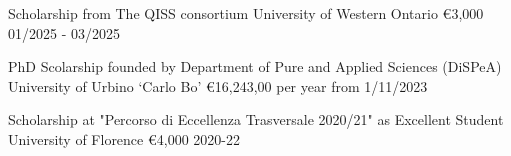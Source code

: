 
\begin{cvhonors}

  \cvhonor
    {Scholarship from The QISS consortium} %
    {University of Western Ontario} %
    {\euro 3,000} %
    {01/2025 - 03/2025} %

\end{cvhonors}

\begin{cvhonors}

  \cvhonor
    {PhD Scolarship founded by Department of Pure and Applied Sciences (DiSPeA)} %
    {University of Urbino `Carlo Bo'} %
    {\euro 16,243,00 per year} %
    {from 1/11/2023} %

\end{cvhonors}

\begin{cvhonors}

  \cvhonor
    {Scholarship at "Percorso di Eccellenza Trasversale 2020/21" as Excellent
Student} %
    {University of Florence} %
    {\euro 4,000} %
    {2020-22} %



\end{cvhonors}





